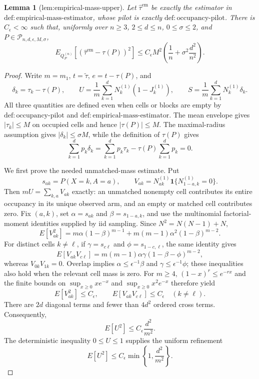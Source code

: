 \documentclass{article}
\newtheorem{lemma}{Lemma}
\begin{document}
\begin{lemma}[lem:empirical-mass-upper]\label{lem:empirical-mass-upper}
Let \(\widehat\tau^{\mathrm{em}}\) be exactly the estimator in \(\mathrm{def:empirical\text{-}mass\text{-}estimator}\), whose pilot is exactly \(\mathrm{def:occupancy\text{-}pilot}\). There is \(C_{\epsilon}<\infty\) such that, uniformly over \(n\ge3\), \(2\le d\le n\), \(0\le\sigma\le2\), and \(P\in\mathcal P_{n,d,\epsilon,M,\sigma}\), \[E_{Q_P^{(n)}}[(\widehat\tau^{\mathrm{em}}-\tau(P))^2]\le C_{\epsilon}M^2\left(\frac1n+\sigma^2\frac{d^2}{n^2}\right).\]
\end{lemma}
\begin{proof}
Write \(m=m_1\), \(t=\widetilde\tau\), \(e=t-\tau(P)\), and
\[
 \delta_k=\tau_k-\tau(P),\qquad
 U=\frac1m\sum_{k=1}^dN_k^{(1)}(1-J_k^{(1)}),\qquad
 S=\frac1m\sum_{k=1}^dN_k^{(1)}\delta_k.
\]
All three quantities are defined even when cells or blocks are empty by \(\mathrm{def:occupancy\text{-}pilot}\) and \(\mathrm{def:empirical\text{-}mass\text{-}estimator}\).  The mean envelope gives \(|\tau_k|\leq M\) on occupied cells and hence \(|\tau(P)|\leq M\).  The maximal-radius assumption gives \(|\delta_k|\leq\sigma M\), while the definition of \(\tau(P)\) gives
\[
 \sum_{k=1}^dp_k\delta_k
 =\sum_{k=1}^dp_k\tau_k-\tau(P)\sum_{k=1}^dp_k=0.
\]

We first prove the needed unmatched-mass estimate.  Put
\[
 s_{ak}=P(X=k,A=a),\qquad
 V_{ak}=N_{ak}^{(1)}\mathbf 1\{N_{1-a,k}^{(1)}=0\}.
\]
Then \(mU=\sum_{k,a}V_{ak}\) exactly: an unmatched nonempty cell contributes its entire occupancy in its unique observed arm, and an empty or matched cell contributes zero.  Fix \((a,k)\), set \(\alpha=s_{ak}\) and \(\beta=s_{1-a,k}\), and use the multinomial factorial-moment identities supplied by iid sampling.  Since \(N^2=N(N-1)+N\),
\[
 E[V_{ak}^2]
 =m\alpha(1-\beta)^{m-1}
  +m(m-1)\alpha^2(1-\beta)^{m-2}.
\]
For distinct cells \(k\ne\ell\), if \(\gamma=s_{c\ell}\) and \(\phi=s_{1-c,\ell}\), the same identity gives
\[
 E[V_{ak}V_{c\ell}]
 =m(m-1)\alpha\gamma(1-\beta-\phi)^{m-2},
\]
whereas \(V_{0k}V_{1k}=0\).  Overlap implies
\(
 \alpha\leq\epsilon^{-1}\beta
\)
and
\(
 \gamma\leq\epsilon^{-1}\phi
\);
these inequalities also hold when the relevant cell mass is zero.  For \(m\geq4\), \((1-x)^r\leq e^{-rx}\) and the finite bounds on \(\sup_{x\geq0}xe^{-x}\) and \(\sup_{x\geq0}x^2e^{-x}\) therefore yield
\[
 E[V_{ak}^2]\leq C_{\epsilon},
 \qquad
 E[V_{ak}V_{c\ell}]\leq C_{\epsilon}\quad(k\ne\ell).
\]
There are \(2d\) diagonal terms and fewer than \(4d^2\) ordered cross terms.  Consequently,
\[
 E[U^2]\leq C_{\epsilon}\frac{d^2}{m^2}.
\]
The deterministic inequality \(0\leq U\leq1\) supplies the uniform refinement
\[
 E[U^2]\leq C_{\epsilon}\min\left\{1,\frac{d^2}{m^2}\right\}. \tag{1}
\]


\end{proof}
\end{document}
